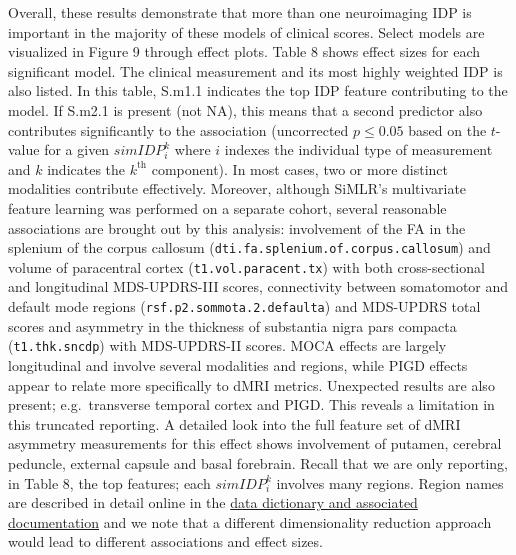\documentclass[
  table]{article}
\begin{document}
Overall, these results demonstrate that more than one neuroimaging IDP
is important in the majority of these models of clinical scores. Select
models are visualized in Figure 9 through effect plots. Table 8 shows
effect sizes for each significant model. The clinical measurement and
its most highly weighted IDP is also listed. In this table, S.m1.1
indicates the top IDP feature contributing to the model. If S.m2.1 is
present (not NA), this means that a second predictor also contributes
significantly to the association (uncorrected \(p \le 0.05\) based on
the \(t\)-value for a given \(simIDP_i^k\) where \(i\) indexes the
individual type of measurement and \(k\) indicates the \(k^\text{th}\)
component). In most cases, two or more distinct modalities contribute
effectively. Moreover, although SiMLR's multivariate feature learning
was performed on a separate cohort, several reasonable associations are
brought out by this analysis: involvement of the FA in the splenium of
the corpus callosum (\texttt{dti.fa.splenium.of.corpus.callosum}) and
volume of paracentral cortex (\texttt{t1.vol.paracent.tx}) with both
cross-sectional and longitudinal MDS-UPDRS-III scores, connectivity
between somatomotor and default mode regions
(\texttt{rsf.p2.sommota.2.defaulta}) and MDS-UPDRS total scores and
asymmetry in the thickness of substantia nigra pars compacta
(\texttt{t1.thk.sncdp}) with MDS-UPDRS-II scores. MOCA effects are
largely longitudinal and involve several modalities and regions, while
PIGD effects appear to relate more specifically to dMRI metrics.
Unexpected results are also present; e.g.~transverse temporal cortex and
PIGD. This reveals a limitation in this truncated reporting. A detailed
look into the full feature set of dMRI asymmetry measurements for this
effect shows involvement of putamen, cerebral peduncle, external capsule
and basal forebrain. Recall that we are only reporting, in Table 8, the
top features; each \(simIDP_i^k\) involves many regions. Region names
are described in detail online in the
\href{http://htmlpreview.github.io/?https://github.com/stnava/ANTsPyMM/blob/main/docs/make_dict_table.html}{data
dictionary and associated documentation} and we note that a different
dimensionality reduction approach would lead to different associations
and effect sizes.
\end{document}
